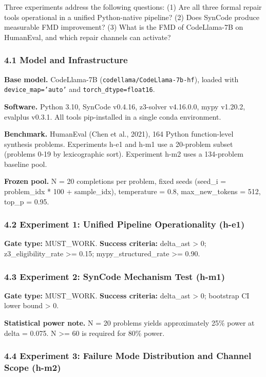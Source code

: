 
Three experiments address the following questions: (1) Are all three formal repair tools operational in a unified Python-native pipeline? (2) Does SynCode produce measurable FMD improvement? (3) What is the FMD of CodeLlama-7B on HumanEval, and which repair channels can activate?

\subsubsection{4.1 Model and Infrastructure}

\textbf{Base model.} CodeLlama-7B (\texttt{codellama/CodeLlama-7b-hf}), loaded with \texttt{device_map='auto'} and \texttt{torch_dtype=float16}.

\textbf{Software.} Python 3.10, SynCode v0.4.16, z3-solver v4.16.0.0, mypy v1.20.2, evalplus v0.3.1. All tools pip-installed in a single conda environment.

\textbf{Benchmark.} HumanEval (Chen et al., 2021), 164 Python function-level synthesis problems. Experiments h-e1 and h-m1 use a 20-problem subset (problems 0-19 by lexicographic sort). Experiment h-m2 uses a 134-problem baseline pool.

\textbf{Frozen pool.} N = 20 completions per problem, fixed seeds (seed_i = problem_idx * 100 + sample_idx), temperature = 0.8, max_new_tokens = 512, top_p = 0.95.

\subsubsection{4.2 Experiment 1: Unified Pipeline Operationality (h-e1)}

\textbf{Gate type:} MUST_WORK. \textbf{Success criteria:} delta_ast > 0; z3_eligibility_rate >= 0.15; mypy_structured_rate >= 0.90.

\subsubsection{4.3 Experiment 2: SynCode Mechanism Test (h-m1)}

\textbf{Gate type:} MUST_WORK. \textbf{Success criteria:} delta_ast > 0; bootstrap CI lower bound > 0.

\textbf{Statistical power note.} N = 20 problems yields approximately 25\% power at delta = 0.075. N >= 60 is required for 80\% power.

\subsubsection{4.4 Experiment 3: Failure Mode Distribution and Channel Scope (h-m2)}

